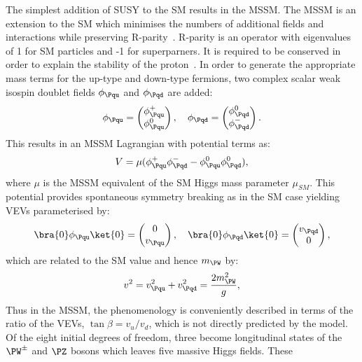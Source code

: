 The simplest addition of \ac{SUSY} to the \ac{SM} results in the \ac{MSSM}. The
\ac{MSSM} is an extension to the \ac{SM} which minimises the numbers of
additional fields and interactions while preserving R-parity~\cite{Dimopoulos:1981zb}. R-parity
is an operator with eigenvalues of 1 for \ac{SM} particles and -1 for
superparners. It is required to be conserved in order to explain the stability
of the proton~\cite{}. In order to generate the appropriate mass terms for the up-type 
and down-type fermions, two complex scalar weak isospin doublet fields
$\phi_{\Pqu}$ and $\phi_{\Pqd}$ are added:
\begin{equation}
\phi_{\Pqu} = \begin{pmatrix}\phi_{\Pqu}^{+} \\ \phi_{\Pqu}^{0} \end{pmatrix}, \quad
\phi_{\Pqd} = \begin{pmatrix}\phi_{\Pqd}^{0} \\ \phi_{\Pqd}^{-} \end{pmatrix}. 
\end{equation}
This results in an \ac{MSSM} Lagrangian with potential terms as:
\begin{equation}
V=\mu(\phi_{\Pqu}^{+}\phi_{\Pqd}^{-} - \phi_{\Pqu}^{0}\phi_{\Pqd}^{0}),
\end{equation}
where $\mu$ is the \ac{MSSM} equivalent of the \ac{SM} Higgs mass parameter
$\mu_{SM}$. This potential provides spontaneous symmetry breaking as in the
\ac{SM} case yielding VEVs parameterised by:
\begin{equation}
\bra{0}\phi_{\Pqu}\ket{0} = \begin{pmatrix} 0 \\ v_{\Pqu}  \end{pmatrix}, \quad
\bra{0}\phi_{\Pqd}\ket{0} = \begin{pmatrix} v_{\Pqd} \\ 0 \end{pmatrix},
\end{equation}
which are related to the \ac{SM} value and hence $m_{\PW}$ by: 
\begin{equation}
v^{2} = v_{\Pqu}^{2} +  v_{\Pqd}^{2} =  \frac{2m_{\PW}^{2}}{g},
\end{equation}
Thus in the \ac{MSSM}, the
phenomenology is conveniently described in terms of the ratio of the VEVs,
$\tan\beta = v_{u}/v_{d}$, which is not directly predicted by the model.
Of the eight initial degrees of freedom, three become longitudinal states of the
$\PW^{\pm}$ and $\PZ$ bosons which leaves five massive Higgs fields. These
